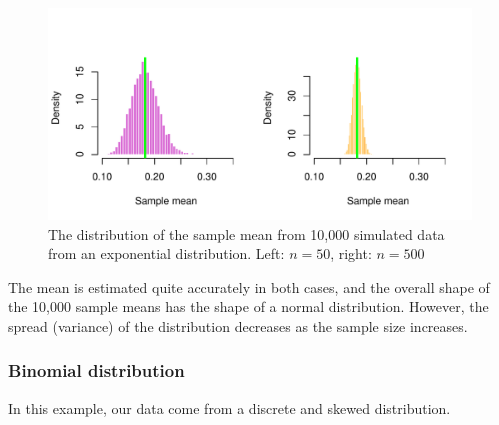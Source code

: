 \begin{knitrout}
\begin{figure}
{\centering \includegraphics[width=\maxwidth]{figure/intro-lln5-1-1} 

}

\caption[The distribution of the sample mean from 10,000 simulated data from an exponential distribution]{The distribution of the sample mean from 10,000 simulated data from an exponential distribution. Left: $n=50$, right: $n=500$}\label{fig:intro-lln5-1}
\end{figure}

\begin{kframe}\begin{alltt}
\hlstd{(}\hlstd{=}\hlstd{(}\hlstd{,}\hlstd{))}
\end{alltt}
\end{kframe}
\end{knitrout}

The mean is estimated quite accurately in both cases, and the overall shape of the 10,000 sample means has the shape of a normal distribution. However, the spread (variance) of the distribution decreases as the sample size increases.

\subsubsection{Binomial distribution}
In this example, our data come from a discrete and skewed distribution.

